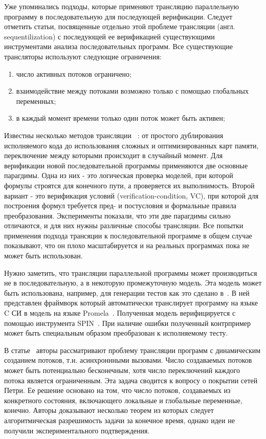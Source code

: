 Уже упоминались подходы, которые применяют трансляцию параллельную программу в последовательную для последующей верификации.
Следует отметить статьи, посвященные отдельно этой проблеме трансляции (англ. sequentilization) с последующей ее верификацией существующими инструментами анализа последовательных программ.
Все существующие трансляторы используют следующие ограничения: 
\begin{enumerate}
\item число активных потоков ограничено;
\item взаимодействие между потоками возможно только с помощью глобальных переменных;
\item в каждый момент времени только один поток может быть активен;
\end{enumerate}
Известны несколько методов трансляции ~\cite{Torre:2009, Ghafari:2010,Inverso:2014, Tomasco:2015}: от простого дублирования исполняемого кода до использования сложных и оптимизированных карт памяти, переключение между которыми происходит в случайный момент.
Для верификации новой последовательной программы применяются две основные парагдимы. Одна из них - это логическая проверка моделей, при которой формулы строятся для конечного пути, а проверяется их выполнимость.
Второй вариант - это верификация условий (verification-condition, VC), при которой для построения формул требуется пред- и постусловия и формальные правила преобразования. Эксперименты показали, что эти две парагдимы сильно отличаются, и для них нужны различные способы трансляции. 
Все попытки применения подхода трансяции к последовательной программе в общем случае показывают, что он плохо масштабируется и на реальных программах пока не может быть использован. 

Нужно заметить, что трансляции параллельной программы может производиться не в последовательную, а в некоторую промежуточную модель.
Эта модель может быть использована, например, для генерации тестов как это сделано в~\cite{KIM200921}.
В ней представлен фраймворк который автоматически транслирует программу на языке C СИ в модель на языке Promela~\cite{SPIN}.
Полученная модель верифицируется с помощью инструмента SPIN~\cite{SPIN}.
При наличие ошибки полученный контрпример может быть специальным образом преобразован к исполняемому тесту.

В статье~\cite{Atig:2009} авторы рассматривают проблему трансляции программ с динамическим созданием потоков, т.н. асинхроннными вызовами.
Число создаваемых потоков может быть потенциально бесконечным, хотя число переключений каждого потока является ограниченным.
Эта задача сводится к вопросу о покрытии сетей Петри. Ее решение основано на том, что число потоков, создаваемых из конкретного состояния, включающего локальные и глобальные переменные, конечно.
Авторы доказывают несколько теорем из которых следует алгоритмическая разрешимость задачи за конечное время, однако идеи не получили экспериментального подтверждения.

